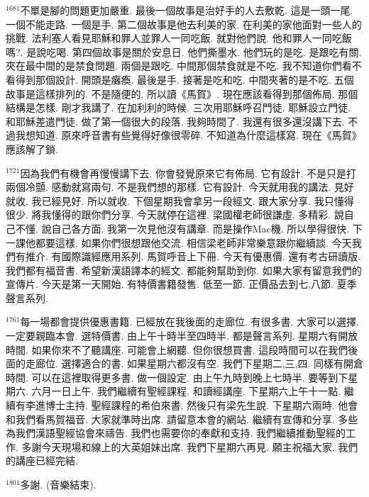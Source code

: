 \documentclass{book}
\begin{document}
$^{1681}$不單是腳的問題更加嚴重.
最後一個故事是治好手的人去敷乾.
這是一頭一尾.
一個不能走路.
一個是手.
第二個故事是他去利美的家.
在利美的家他面對一些人的挑戰.
法利塞人看見耶穌和罪人並罪人一同吃飯.
就對他們說.
他和罪人一同吃飯嗎?.
是說吃喝.
第四個故事是關於安息日.
他們撕墨水.
他們玩的是吃.
是跟吃有關.
夾在最中間的是禁食問題.
兩個是跟吃.
中間那個禁食就是不吃.
我不知道你們看不看得到那個設計.
開頭是癱瘓.
最後是手.
接著是吃和吃.
中間夾著的是不吃.
五個故事是這樣排列的.
不是隨便的.
所以讀《馬賀》.
現在應該看得到那個佈局.
那個結構是怎樣.
剛才我講了.
在加利利的時候.
三次用耶穌呼召門徒.
耶穌設立門徒.
和耶穌差遣門徒.
做了第一個很大的段落.
我夠時間了.
我還有很多還沒講下去.
不過我想知道.
原來呼音書有些覺得好像很零碎.
不知道為什麼這樣寫.
現在《馬賀》應該解了鎖.

$^{1721}$因為我們有機會再慢慢講下去.
你會發覺原來它有佈局.
它有設計.
不是只是打兩個冷顫.
感動就寫兩句.
不是我們想的那樣.
它有設計.
今天就用我的講法.
見好就收.
我已經見好.
所以就收.
下個星期我會拿另一段經文.
跟大家分享.
我只懂得很少.
將我懂得的跟你們分享.
今天就停在這裡.
梁國權老師很謙虛.
多精彩.
說自己不懂.
說自己各方面.
我第一次見他沒有講章.
而是操作Mac機.
所以學得很快.
下一課他都要這樣.
如果你們很想跟他交流.
相信梁老師非常樂意跟你繼續談.
今天我們有推介.
有國際識經應用系列.
馬賀呼音上下冊.
今天有優惠價.
還有考古研讀版.
我們都有福音書.
希望新漢語譯本的經文.
都能夠幫助到你.
如果大家有留意我們的宣傳片.
今天是第一天開始.
有特價書籍發售.
低至一節.
正價品去到七,八節.
夏季聲言系列.

$^{1761}$每一場都會提供優惠書籍.
已經放在我後面的走廊位.
有很多書.
大家可以選擇.
一定要親臨本會.
選特價書.
由上午十時半至四時半.
都是聲言系列.
星期六有開放時間.
如果你來不了聽講座.
可能會上網聽.
但你很想買書.
這段時間可以在我們後面的走廊位.
選擇適合的書.
如果星期六都沒有空.
我們下星期二,三,四.
同樣有開倉時間.
可以在這裡取得更多書.
做一個設定.
由上午九時到晚上七時半.
要等到下星期六.
六月一日上午.
我們繼續有聖經課程.
和讀經講座.
下星期六上午十一點.
繼續有李進博士主持.
聖經課程的希伯來書.
然後只有梁先生說.
下星期六兩時.
他會和我們看馬賀福音.
大家就準時出席.
請留意本會的網站.
繼續有宣傳和分享.
多些為我們漢語聖經協會來禱告.
我們也需要你的奉獻和支持.
我們繼續推動聖經的工作.
多謝今天現場和線上的大英姐妹出席.
我們下星期六再見.
願主祝福大家.
我們的講座已經完結.

$^{1801}$多謝.
(音樂結束).
\newpage
\end{document}

